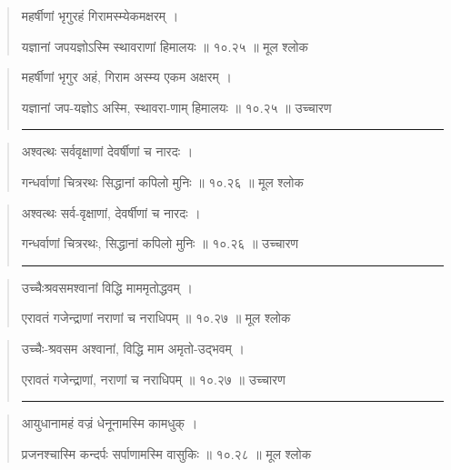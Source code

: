 \begin{quotation} 

महर्षीणां भृगुरहं गिरामस्म्येकमक्षरम्‌  ।  

यज्ञानां जपयज्ञोऽस्मि स्थावराणां हिमालयः  ॥ १०.२५ ॥  मूल श्लोक
\end{quotation}

\begin{quotation}

महर्षीणां भृगुर अहं, गिराम अस्म्य एकम अक्षरम्‌  ।  

यज्ञानां जप-यज्ञोऽ अस्मि, स्थावरा-णाम् हिमालयः  ॥ १०.२५ ॥  उच्चारण

\noindent\rule{16cm}{0.4pt} 
\end{quotation}


\begin{quotation} 

अश्वत्थः सर्ववृक्षाणां देवर्षीणां च नारदः ।  

गन्धर्वाणां चित्ररथः सिद्धानां कपिलो मुनिः  ॥ १०.२६ ॥  मूल श्लोक
\end{quotation}

\begin{quotation}

अश्वत्थः सर्व-वृक्षाणां, देवर्षीणां च नारदः  ।  

गन्धर्वाणां चित्ररथः, सिद्धानां कपिलो मुनिः  ॥ १०.२६ ॥  उच्चारण

\noindent\rule{16cm}{0.4pt} 
\end{quotation}


\begin{quotation} 

उच्चैःश्रवसमश्वानां विद्धि माममृतोद्धवम्‌  ।  

एरावतं गजेन्द्राणां नराणां च नराधिपम्‌  ॥ १०.२७ ॥  मूल श्लोक
\end{quotation}

\begin{quotation}

उच्चैः-श्रवसम अश्वानां, विद्धि माम अमृतो-उद्भवम्  ।  

एरावतं गजेन्द्राणां, नराणां च नराधिपम्‌  ॥ १०.२७ ॥  उच्चारण

\noindent\rule{16cm}{0.4pt} 
\end{quotation}


\begin{quotation} 
आयुधानामहं वज्रं धेनूनामस्मि कामधुक्‌  ।  

प्रजनश्चास्मि कन्दर्पः सर्पाणामस्मि वासुकिः  ॥ १०.२८ ॥  मूल श्लोक
\end{quotation}

